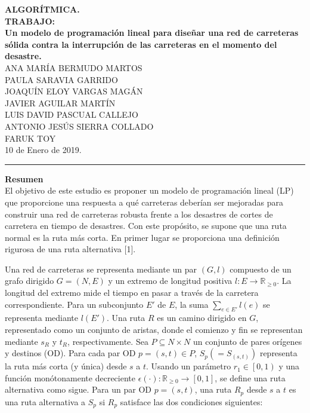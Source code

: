 \documentclass[10pt]{report}
\author{M.Miranda}
\begin{document}
	\sloppy
	

\begin{center}
	\textbf{ALGOR\'ITMICA.}\\
	\textbf{TRABAJO:}\\
	\textbf{Un modelo de programación lineal para diseñar una red de carreteras sólida contra la interrupción de las carreteras en el momento del desastre.}\\	
	\textsc{ANA MARÍA BERMUDO MARTOS}\\
	\textsc{PAULA SARAVIA GARRIDO}\\
	\textsc{JOAQUÍN ELOY VARGAS MAGÁN}\\
	\textsc{JAVIER AGUILAR MARTÍN}\\
	\textsc{LUIS DAVID PASCUAL CALLEJO}\\
	\textsc{ANTONIO JES\'US SIERRA COLLADO}\\
    \textsc{FARUK TOY}\\
	10 de Enero de 2019.
	\noindent\rule{15.3cm}{0.4pt}
\end{center}
\textbf{Resumen}\\


El objetivo de este estudio es proponer un modelo de programaci\'on lineal (LP) que proporcione una respuesta a  qu\'e carreteras deber\'ian ser mejoradas para construir una red de carreteras robusta frente a los desastres de cortes de carretera en tiempo de desastres. Con este prop\'osito, se supone que una ruta normal es la ruta más corta. En primer lugar se proporciona una definición rigurosa de una ruta alternativa [1].
 
 Una red de carreteras se representa mediante un par $\left( G, l\right)$ compuesto de un grafo dirigido $G=\left( N, E\right)$ y un extremo de longitud positiva $l:E\longrightarrow \mathbb{R}_{\geq 0}$. La longitud del extremo mide  el tiempo en pasar a través de la carretera correspondiente. Para un subconjunto $E'$ de $E$, la suma $\sum_{e\in E '}l\left( e\right)$ se representa mediante $l\left( E' \right)$. Una ruta $R$ es un camino dirigido en $G$, representado como un conjunto  de aristas, donde el  comienzo y fin se representan mediante $s_{R}$ y $t_{R}$, respectivamente. Sea $P \subseteq N \times N$ un conjunto de pares orígenes y destinos (OD). Para cada par OD $p = \left( s, t\right) \in P$, $S_{p}\left( = S_{\left( s, t\right)}\right)$ representa la ruta más corta (y única) desde $s$ a $t$. Usando un parámetro $r_{1}\in \left[ 0, 1\right)$ y una función monótonamente decreciente $\epsilon \left( \cdot \right): \mathbb{R}_{\geq 0} \longrightarrow \left[ 0,1\right]$, se define una ruta alternativa como sigue. Para un par OD $p=\left( s, t \right)$, una ruta $R_{p}$ desde $s$ a $t$ es una ruta alternativa a $S_{p}$ si $R_{p}$ satisface las dos condiciones siguientes:
\end{document}

